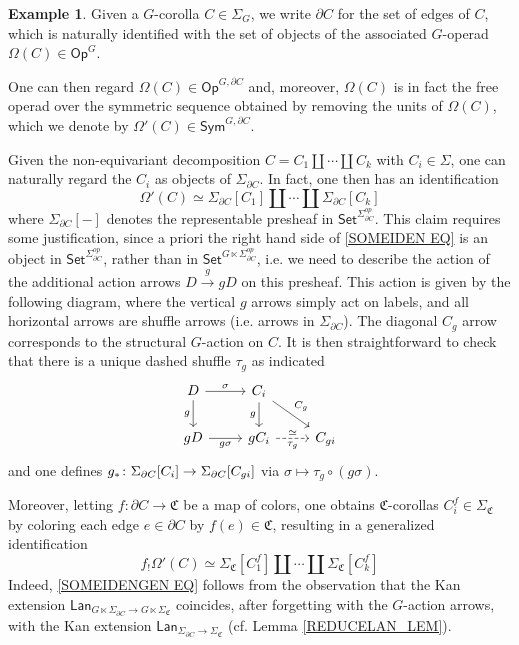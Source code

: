 \documentclass[a4paper,10pt
,draft
]{article}%
\numberwithin{equation}{section}
\numberwithin{figure}{section}
\theoremstyle{definition} %
\newtheorem{example}[equation]{Example}%
\newcommand{\1}{\ensuremath{\mathbbm 1}}%
\begin{document}
\begin{example}\label{GCORMPA EX}
	Given a $G$-corolla $C \in \Sigma_G$, we write $\partial C$ for the set of edges of $C$, which is naturally identified with the set of objects of the associated $G$-operad
	$\Omega(C) \in \mathsf{Op}^G$.
	
	One can then regard $\Omega(C) \in \mathsf{Op}^{G,\partial C}$ and, moreover, $\Omega(C)$ is in fact the free operad over the symmetric sequence obtained by removing the units of $\Omega(C)$,
	which we denote by
	$\Omega'(C) \in \mathsf{Sym}^{G,\partial C}$.
	
	Given the non-equivariant decomposition
	$C = C_1 \amalg \cdots \amalg C_k$
	with $C_i \in \Sigma$, 
	one can naturally regard the $C_i$ as objects of $\Sigma_{\partial C}$.
	In fact, one then has an identification
	\begin{equation}\label{SOMEIDEN EQ}
	\Omega'(C) \simeq 
	\Sigma_{\partial C}[C_1] \amalg \cdots \amalg \Sigma_{\partial C}[C_k]
	\end{equation}
	where $\Sigma_{\partial C}[-]$ denotes the representable presheaf in 
	$\mathsf{Set}^{\Sigma_{\partial C}^{op}}$.
	This claim requires some justification, since a priori the right hand side of \eqref{SOMEIDEN EQ} is an object in $\mathsf{Set}^{\Sigma_{\partial C}^{op}}$,
	rather than in $\mathsf{Set}^{G \ltimes \Sigma_{\partial C}^{op}}$,
	i.e. we need to describe the action of the additional action arrows
	$D \xrightarrow{g} gD$ on this presheaf.
	This action is given by the following diagram, where the vertical $g$ arrows simply act on labels, and all horizontal arrows are shuffle arrows (i.e. arrows in $\Sigma_{\partial C}$).
	The diagonal $C_g$ arrow corresponds to the structural $G$-action on $C$. It is then straightforward to check that there is a unique dashed shuffle $\tau_g$ as indicated
	\[
	\begin{tikzcd}
	D \ar{d}[swap]{g} \ar{r}{\sigma} & C_i \ar{rd}{C_g} \ar{d}[swap]{g}
	\\
	g D \ar{r}[swap]{g \sigma} & g C_i \ar[dashed]{r}{\simeq}[swap]{\tau_g} & C_{g i}
	\end{tikzcd}
	\]
	and one defines $g_{\**}\colon \Sigma_{\partial C}[C_i] \to \Sigma_{\partial C}[C_{gi}]$
	via $\sigma \mapsto \tau_g \circ (g \sigma)$.
	
	Moreover, letting $f \colon \partial C \to \mathfrak{C}$
	be a map of colors, 
	one obtains $\mathfrak{C}$-corollas $C_i^{f} \in \Sigma_{\mathfrak{C}}$
	by coloring each edge $e\in \partial C$ by $f(e) \in \mathfrak{C}$, resulting in a generalized identification 
	\begin{equation}\label{SOMEIDENGEN EQ}
	f_{!} \Omega'(C) \simeq 
	\Sigma_{\mathfrak{C}}[C_1^f] \amalg \cdots \amalg \Sigma_{\mathfrak{C}}[C^f_k]
	\end{equation}
	Indeed, \eqref{SOMEIDENGEN EQ} follows from the observation
	that the Kan extension 
	$\mathsf{Lan}_{G \ltimes \Sigma_{\partial C} \to G \ltimes \Sigma_{\mathfrak{C}}}$ 
	coincides, after forgetting with the $G$-action arrows,
	with the Kan extension
	$\mathsf{Lan}_{\Sigma_{\partial C} \to \Sigma_{\mathfrak{C}}}$
	(cf. Lemma \ref{REDUCELAN_LEM}).
\end{example}
\end{document}
